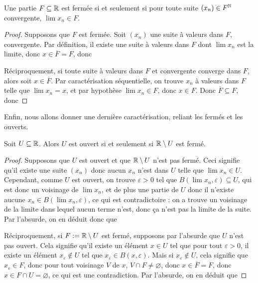 \begin{prop}
    Une partie $F\subseteq\mathbb{R}$ est fermée si et seulement si pour toute suite $(x_n)\in F^{\mathbb{N}}$ convergente, $\lim x_n \in F$.
\end{prop}

\begin{proof}
    Supposons que $F$ est fermée. Soit $(x_n)$ une suite à valeurs dans $F$, convergente. Par définition, il existe une suite à valeurs dans $F$ dont $\lim x_n$ est la limite, donc $x\in \overline F = F$, donc 

    Réciproquement, si toute suite à valeurs dans $F$ et convergente converge dans $F$, alors soit $x\in\overline F$. Par caractérisation séquentielle, on trouve $x_n$ à valeurs dans $F$ telle que $\lim x_n = x$, et par hypothèse $\lim x_n \in F$, donc $x\in F$. Donc $\overline F \subseteq F$, donc 
\end{proof}

Enfin, nous allons donner une dernière caractérisation, reliant les fermés et les ouverts.

\begin{prop}
    Soit $U\subseteq\mathbb{R}$. Alors $U$ est ouvert si et seulement si $\mathbb{R}\setminus U$ est fermé.
\end{prop}

\begin{proof}
    Supposons que $U$ est ouvert et que $\mathbb{R}\setminus U$ n'est pas fermé. Ceci signifie qu'il existe une suite $(x_n)$ donc aucun $x_n$ n'est dans $U$ telle que $\lim x_n \in U$. Cependant, comme $U$ est ouvert, on trouve $\varepsilon > 0$ tel que $B(\lim x_n,\varepsilon)\subseteq U$, qui est donc un voisinage de $\lim x_n$, et de plus une partie de $U$ donc il n'existe aucune $x_n \in B(\lim x_n,\varepsilon)$, ce qui est contradictoire : on a trouve un voisinage de la limite dans lequel aucun terme n'est, donc ça n'est pas la limite de la suite. Par l'absurde, on en déduit donc que 

    Réciproquement, si $F := \mathbb{R}\setminus U$ est fermé, supposons par l'absurde que $U$ n'est pas ouvert. Cela signifie qu'il existe un élément $x\in U$ tel que pour tout $\varepsilon > 0$, il existe un élément $x_\varepsilon\notin U$ tel que $x_\varepsilon \in B(x,\varepsilon)$. Mais si $x_\varepsilon\notin U$, cela signifie que $x_\varepsilon\in F$, donc pour tout voisinage $V$ de $x$, $V\cap F \neq \varnothing$, donc $x\in \overline F = F$, donc $x\in F \cap U = \varnothing$, ce qui est une contradiction. Par l'absurde, on en déduit que  
\end{proof}

